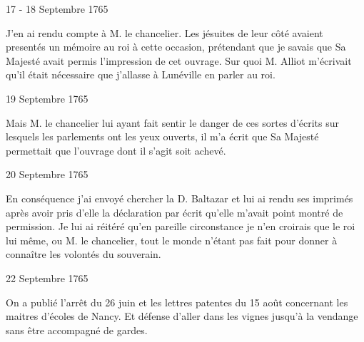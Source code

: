                      \begin{diary}{17 - 18 Septembre 1765}{}

                         J'en ai rendu compte à M. le chancelier.
                           Les jésuites de leur côté avaient presentés un
                           mémoire au roi à cette
                           occasion, prétendant
                           que je savais que Sa Majesté avait permis l'impression
                           de cet ouvrage. Sur quoi M.
                              Alliot m'écrivait
                           qu'il était nécessaire que j'allasse à Lunéville
                           en parler au roi. \bigskip


                     \end{diary}

                     \begin{diary}{19 Septembre 1765}{}

                         Mais M. le chancelier lui ayant fait
                           sentir le danger de ces sortes d'écrits sur
                           lesquels les parlements ont les yeux ouverts,
                           il m'a écrit que Sa Majesté permettait que l'ouvrage
                           dont il s'agit soit achevé. \bigskip


                     \end{diary}

                     \begin{diary}{20 Septembre 1765}{}

                         En conséquence j'ai envoyé chercher la
                           D.
                              Baltazar et lui ai rendu ses imprimés
                           après avoir pris d'elle la déclaration par
                           écrit qu'elle m'avait point montré de
                           permission. Je lui ai réitéré qu'en pareille
                           circonstance je n'en croirais que le roi
                           lui même, ou M. le
                              chancelier, tout le
                           monde n'étant pas fait pour donner
                           à connaître les volontés du souverain. \bigskip


                     \end{diary}



                     \begin{diary}{22 Septembre 1765}{}

                         On a publié l'arrêt du 26 juin et les lettres patentes
                           du 15 août concernant les maitres
                           d'écoles de
                           Nancy. Et défense d'aller dans les vignes jusqu'à
                           la vendange sans être accompagné de gardes. \bigskip


                     \end{diary}

